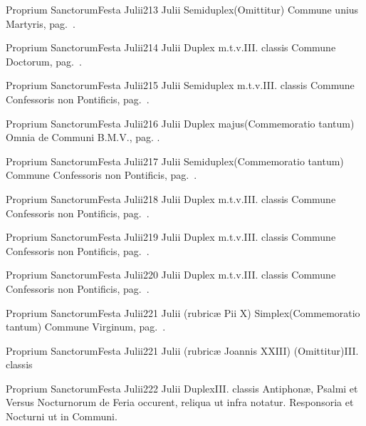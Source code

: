 \documentclass[nocturnale-romanum.tex]{subfiles}
\begin{document}
	{Proprium Sanctorum}{Festa Julii}{2}{13 Julii}
	{Semiduplex}{(Omittitur)}
	{Commune unius Martyris, pag.\ \pageref{M-UMEX}.}
	{}

	{Proprium Sanctorum}{Festa Julii}{2}{14 Julii}
	{Duplex m.t.v.}{III. classis}
	{Commune Doctorum, pag.\ \pageref{M-CODO}.}
	{}

	{Proprium Sanctorum}{Festa Julii}{2}{15 Julii}
	{Semiduplex m.t.v.}{III. classis}
	{Commune Confessoris non Pontificis, pag.\ \pageref{M-CONP}.}
	{}

	{Proprium Sanctorum}{Festa Julii}{2}{16 Julii}
	{Duplex majus}{(Commemoratio tantum)}
	{Omnia de Communi B.M.V., pag. \pageref{M-CBMV}.}
	{}

	{Proprium Sanctorum}{Festa Julii}{2}{17 Julii}
	{Semiduplex}{(Commemoratio tantum)}
	{Commune Confessoris non Pontificis, pag.\ \pageref{M-CONP}.}
	{}

	{Proprium Sanctorum}{Festa Julii}{2}{18 Julii}
	{Duplex m.t.v.}{III. classis}
	{Commune Confessoris non Pontificis, pag.\ \pageref{M-CONP}.}
	{}

	{Proprium Sanctorum}{Festa Julii}{2}{19 Julii}
	{Duplex m.t.v.}{III. classis}
	{Commune Confessoris non Pontificis, pag.\ \pageref{M-CONP}.}
	{}

	{Proprium Sanctorum}{Festa Julii}{2}{20 Julii}
	{Duplex m.t.v.}{III. classis}
	{Commune Confessoris non Pontificis, pag.\ \pageref{M-CONP}.}
	{}

	{Proprium Sanctorum}{Festa Julii}{2}{21 Julii (rubricæ Pii X)}
	{Simplex}{(Commemoratio tantum)}
	{Commune Virginum, pag.\ \pageref{M-MU}.}
	{}

	{Proprium Sanctorum}{Festa Julii}{2}{21 Julii (rubricæ Joannis XXIII)}
	{(Omittitur)}{III. classis}
	{}
	{}

	{Proprium Sanctorum}{Festa Julii}{2}{22 Julii}
	{Duplex}{III. classis}
	{Antiphonæ, Psalmi et Versus Nocturnorum de Feria occurent, reliqua ut infra notatur. %
	Responsoria  et  Nocturni ut in Communi.}
	{}
\end{document}

